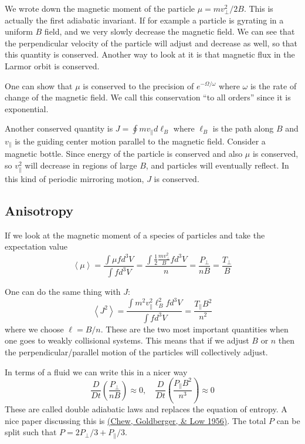 \documentclass[letterpaper, 11pt]{article}
\numberwithin{equation}{section}
\numberwithin{figure}{section}
\begin{document}
We wrote down the magnetic moment of the particle $\mu = mv_{\perp}^2/2B$. This
is actually the first adiabatic invariant. If for example a particle is gyrating
in a uniform $B$ field, and we very slowly decrease the magnetic field. We can
see that the perpendicular velocity of the particle will adjust and decrease as
well, so that this quantity is conserved. Another way to look at it is that
magnetic flux in the Larmor orbit is conserved.

One can show that $\mu$ is conserved to the precision of $e^{-\Omega/\omega}$
where $\omega$ is the rate of change of the magnetic field. We call this
conservation ``to all orders'' since it is exponential.

Another conserved quantity is $J = \oint m v_{\parallel} d\ell_B$ where $\ell_B$
is the path along $B$ and $v_{\parallel}$ is the guiding center motion parallel
to the magnetic field. Consider a magnetic bottle. Since energy of the particle
is conserved and also $\mu$ is conserved, so $v_{\parallel}^2$ will decrease in
regions of large $B$, and particles will eventually reflect. In this kind of
periodic mirroring motion, $J$ is conserved.

\subsection{Anisotropy}

If we look at the magnetic moment of a species of particles and take the
expectation value
\begin{equation}
  \label{eq:29}
  \left<\mu \right> = \frac{\int \mu f d^3V}{\int f d^3V} = \frac{\int \frac{1}{2}\frac{mv_{\perp}^2}{B}f d^3V}{n} = \frac{P_{\perp}}{nB} = \frac{T_{\perp}}{B}
\end{equation}

One can do the same thing with $J$:
\begin{equation}
  \label{eq:30}
  \left\langle J^2 \right\rangle = \frac{\int m^2v_{\parallel}^2\ell_B^2 f d^3V}{\int f d^3V} = \frac{T_{\parallel}B^2}{n^2}
\end{equation}
where we choose $\ell = B/n$. These are the two most important quantities when
one goes to weakly collisional systems. This means that if we adjust $B$ or $n$
then the perpendicular/parallel motion of the particles will collectively
adjust.

In terms of a fluid we can write this in a nicer way
\begin{equation}
  \label{eq:31}
  \frac{D}{Dt}\left( \frac{P_{\perp}}{nB} \right) \approx 0,\quad \frac{D}{Dt}\left( \frac{P_{\parallel}B^2}{n^3} \right) \approx 0
\end{equation}
These are called double adiabatic laws and replaces the equation of entropy. A
nice paper discussing this is \href{http://rspa.royalsocietypublishing.org/content/236/1204/112}{(Chew, Goldberger, \& Low 1956)}. The total $P$ can
be split such that $P = 2P_{\perp} / 3 + P_{\parallel} / 3$.
\end{document}
